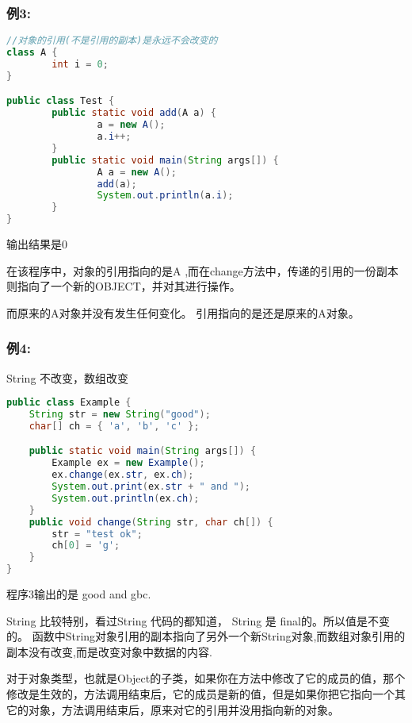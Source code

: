 \documentclass[10pt,b5paper]{article}
\begin{document}
\subsubsection{例3:}
\label{sec-1-5-3}
\begin{lstlisting}[language=java]
//对象的引用(不是引用的副本)是永远不会改变的
class A {
        int i = 0;
}

public class Test {
        public static void add(A a) {
                a = new A();
                a.i++;
        }
        public static void main(String args[]) {
                A a = new A();
                add(a);
                System.out.println(a.i);
        }
}
\end{lstlisting}

输出结果是0

在该程序中，对象的引用指向的是A ,而在change方法中，传递的引用的一份副本则指向了一个新的OBJECT，并对其进行操作。  

而原来的A对象并没有发生任何变化。 引用指向的是还是原来的A对象。 
\subsubsection{例4:}
\label{sec-1-5-4}
String 不改变，数组改变
\begin{lstlisting}[language=java]
public class Example {  
    String str = new String("good");  
    char[] ch = { 'a', 'b', 'c' };  

    public static void main(String args[]) {  
        Example ex = new Example();  
        ex.change(ex.str, ex.ch);  
        System.out.print(ex.str + " and ");  
        System.out.println(ex.ch);  
    }  
    public void change(String str, char ch[]) {  
        str = "test ok";  
        ch[0] = 'g';  
    }  
}   
\end{lstlisting}
程序3输出的是 good and gbc.  

String 比较特别，看过String 代码的都知道， String 是 final的。所以值是不变的。 函数中String对象引用的副本指向了另外一个新String对象,而数组对象引用的副本没有改变,而是改变对象中数据的内容.  

对于对象类型，也就是Object的子类，如果你在方法中修改了它的成员的值，那个修改是生效的，方法调用结束后，它的成员是新的值，但是如果你把它指向一个其它的对象，方法调用结束后，原来对它的引用并没用指向新的对象。
\end{document}
